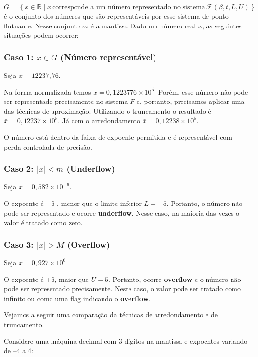 \[
G = \left\{ x \in \mathbb{R} \mid x\ \text{corresponde a um número representado no sistema}\ \mathcal{F}(\beta,t,L,U) \right\}
\]
é o conjunto dos números que são representáveis por esse sistema de ponto flutuante. Nesse conjunto \( m \) é a mantissa %
Dado um número real $x$, as seguintes situações podem ocorrer:

\subsubsection{Caso 1: \( x \in G \) (Número representável)}
Seja $x = 12237,76$. 

Na forma normalizada temos \(x = 0,1223776 \times10^5\).
Porém, esse número não pode ser representado precisamente no sistema $F$ e, portanto, precisamos aplicar uma das técnicas de aproximação. Utilizando o truncamento o resultado é \( \bar{x} = 0{,}12237 \times 10^5 \). Já com o arredondamento \( \bar{x} = 0{,}12238 \times 10^5 \).

O número está dentro da faixa de expoente permitida e é representável com perda controlada de precisão.

\subsubsection*{Caso 2: \( |x| < m \) (Underflow)}

Seja \( x = 0{,}582 \times 10^{-6} \).

O expoente é  \(-6\) , menor que o limite inferior $L = -5$. Portanto, o número não pode ser representado e ocorre \textbf{underflow}. Nesse caso, na maioria das vezes o valor é tratado como zero.

\subsubsection*{Caso 3: \( |x| > M \) (Overflow)}

Seja \( x = 0{,}927 \times 10^6 \)

O expoente é +6, maior que $U = 5$. 
Portanto, ocorre \textbf{overflow} e o número não pode ser representado precisamente. Neste caso, o valor pode ser tratado como infinito ou como uma flag indicando o \textbf{overflow}.


Vejamos a seguir uma comparação da técnicas de arredondamento e de truncamento.

Considere uma máquina decimal com 3 dígitos na mantissa e expoentes variando de –4 a 4:

